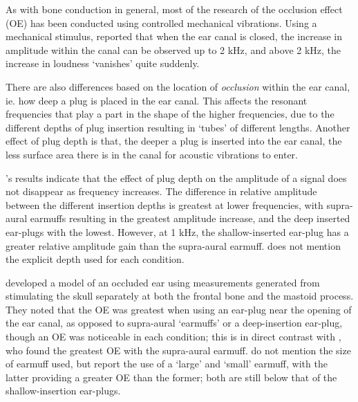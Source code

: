  
As with bone conduction in general, most of the research of the occlusion effect (OE) has been conducted using controlled mechanical vibrations.  Using a mechanical stimulus, \cite{bekesy:60} reported that when the ear canal is closed, the increase in amplitude within the canal can be observed up to 2 kHz, and above 2 kHz, the increase in loudness `vanishes' quite suddenly. %

There are also differences based on the location of \textit{occlusion} within the ear canal, ie. how deep a plug is placed in the ear canal.  This affects the resonant frequencies that play a part in the shape of the higher frequencies, due to the different depths of plug insertion resulting in `tubes' of different lengths.  Another effect of plug depth is that, the deeper a plug is inserted into the ear canal, the less surface area there is in the canal for acoustic vibrations to enter.  

\cite{dean:00}'s results indicate that the effect of plug depth on the amplitude of a signal does not disappear as frequency increases. The difference in relative amplitude between the different insertion depths is greatest at lower frequencies, with supra-aural earmuffs resulting in the greatest amplitude increase, and the deep inserted ear-plugs with the lowest.  However, at 1 kHz, the shallow-inserted ear-plug has a greater relative amplitude gain than the supra-aural earmuff.  \cite{dean:00} does not mention the explicit depth used for each condition. 


\cite{stenfelt:07} developed a model of an occluded ear using measurements generated from stimulating the skull separately at both the frontal bone and the mastoid process.
%
%
They noted that the OE was greatest when using an ear-plug near the opening of the ear canal, as opposed to supra-aural `earmuffs' or a deep-insertion ear-plug, though an OE was noticeable in each condition; this is in direct contrast with \cite{dean:00}, who found the greatest OE with the supra-aural earmuff.  \cite{dean:00} do not mention the size of earmuff used, but \cite{stenfelt:07} report the use of a `large' and `small' earmuff, with the latter providing a greater OE than the former; both are still below that of the shallow-insertion ear-plugs.

